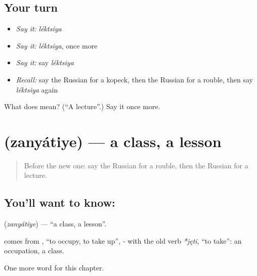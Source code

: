 \subsection*{Your turn}
\begin{itemize}
\raggedright
  \item \emph{Say it:} \emph{léktsiya}
  \item \emph{Say it:} \emph{léktsiya}, once more
  \item \emph{Say it:} say \emph{léktsiya}
  \item \emph{Recall:} say the Russian for a kopeck, then the Russian for a rouble, then say \emph{léktsiya} again
\end{itemize}

\begin{tcolorbox}[breakable,colback=teal!4,colframe=teal!35!black,title={Before you move on}]
What does  mean? (\textquotedblleft{}A lecture\textquotedblright{}.) Say it once more.
\end{tcolorbox}
\section[\texorpdfstring{\ru{занятие} (zanyátiye)}{занятие (zanyátiye)}]{ (zanyátiye) — a class, a lesson}

\label{lesson:RU-C231-zanyatiye}



\begin{quote}
Before the new one: say the Russian for a rouble, then the Russian for a lecture.
\end{quote}

\subsection*{You'll want to know: }
\textbf{} (\emph{zanyátiye}) — \textquotedblleft{}a class, a lesson\textquotedblright{}.

\begin{cousinweb}
\textbf{} comes from \emph{}, \textquotedblleft{}to occupy, to take up\textquotedblright{}, \emph{-} with the old verb \emph{*jęti}, \textquotedblleft{}to take\textquotedblright{}: an occupation, a class.
\end{cousinweb}

\begin{grammarlens}[title={What you've built}]
One more word for this chapter.
\end{grammarlens}

